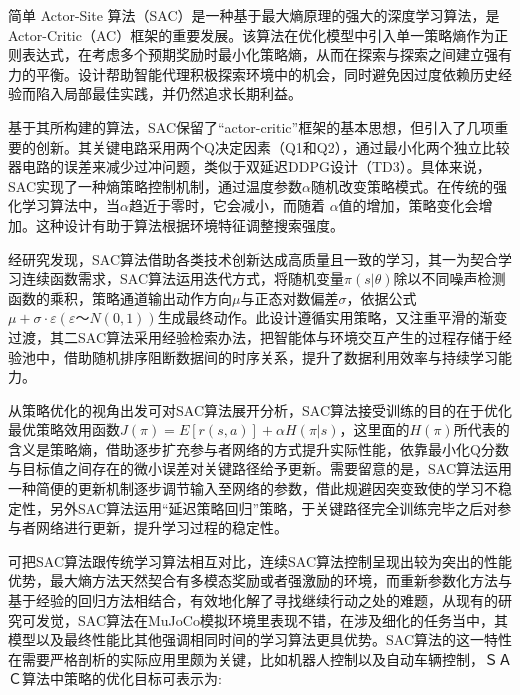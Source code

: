 简单 Actor-Site 算法（SAC）\cite{zhou2022computation}是一种基于最大熵原理的强大的深度学习算法，是 Actor-Critic（AC）框架的重要发展。该算法在优化模型中引入单一策略熵作为正则表达式，在考虑多个预期奖励时最小化策略熵，从而在探索与探索之间建立强有力的平衡。设计帮助智能代理积极探索环境中的机会，同时避免因过度依赖历史经验而陷入局部最佳实践，并仍然追求长期利益。

基于其所构建的算法，SAC保留了“actor-critic”框架的基本思想，但引入了几项重要的创新。其关键电路采用两个Q决定因素（Q1和Q2），通过最小化两个独立比较器电路的误差来减少过冲问题，类似于双延迟DDPG设计（TD3）。具体来说，SAC实现了一种熵策略控制机制，通过温度参数$α$随机改变策略模式。在传统的强化学习算法中，当$α$趋近于零时，它会减小，而随着 $α$值的增加，策略变化会增加。这种设计有助于算法根据环境特征调整搜索强度。


经研究发现，SAC算法借助各类技术创新达成高质量且一致的学习，其一为契合学习连续函数需求，SAC算法运用迭代方式，将随机变量$π(s|θ)$除以不同噪声检测函数的乘积，策略通道输出动作方向$μ$与正态对数偏差$σ$，依据公式$μ+σ·ε(ε～N(0,1))$生成最终动作。此设计遵循实用策略，又注重平滑的渐变过渡，其二SAC算法采用经验检索办法，把智能体与环境交互产生的过程存储于经验池中，借助随机排序阻断数据间的时序关系，提升了数据利用效率与持续学习能力。


从策略优化的视角出发可对SAC算法展开分析，SAC算法接受训练的目的在于优化最优策略效用函数$J(π) = E[r(s,a)] + αH(π|s)$，这里面的$H(π)$所代表的含义是策略熵，借助逐步扩充参与者网络的方式提升实际性能，依靠最小化Q分数与目标值之间存在的微小误差对关键路径给予更新。需要留意的是，SAC算法运用一种简便的更新机制逐步调节输入至网络的参数，借此规避因突变致使的学习不稳定性，另外SAC算法运用“延迟策略回归”策略，于关键路径完全训练完毕之后对参与者网络进行更新，提升学习过程的稳定性。

可把SAC算法跟传统学习算法相互对比，连续SAC算法控制呈现出较为突出的性能优势，最大熵方法天然契合有多模态奖励或者强激励的环境，而重新参数化方法与基于经验的回归方法相结合，有效地化解了寻找继续行动之处的难题，从现有的研究可发觉，SAC算法在MuJoCo模拟环境里表现不错，在涉及细化的任务当中，其模型以及最终性能比其他强调相同时间的学习算法更具优势。SAC算法的这一特性在需要严格剖析的实际应用里颇为关键，比如机器人控制以及自动车辆控制，ＳＡＣ算法中策略的优化目标可表示为:

